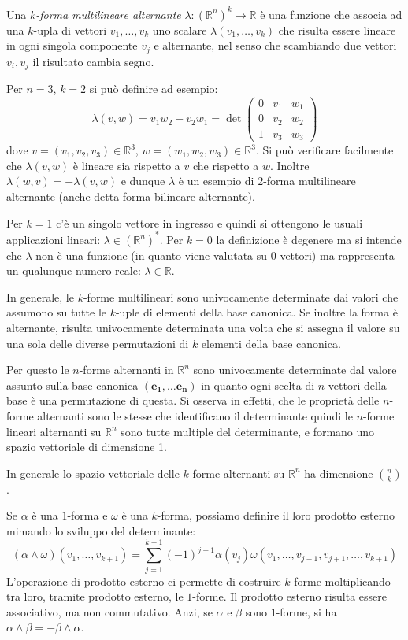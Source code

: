 \documentclass[italian,a4paper]{scrartcl}
\newcommand{\RR}{{\mathbb R}}
\renewcommand{\vec}{\mathbf}
\begin{document}
Una \emph{$k$-forma multilineare alternante} $\lambda\colon (\RR^n)^k \to \RR$ è
una funzione che associa ad una $k$-upla di vettori $v_1,\dots,v_k$
uno scalare $\lambda(v_1,\dots, v_k)$ che risulta essere lineare in
ogni singola componente $v_j$ e alternante, nel senso che scambiando
due vettori $v_i, v_j$ il risultato cambia segno.

\begin{example}
Per $n=3$, $k=2$ si può definire ad esempio:
\[
 \lambda(v, w) = v_1w_2 - v_2w_1
= \det\begin{pmatrix}
0 & v_1 & w_1\\
0 & v_2 & w_2\\
1 & v_3 & w_3
\end{pmatrix}
\]
dove $v=(v_1,v_2,v_3) \in \RR^3$, $w=(w_1,w_2,w_3) \in \RR^3$. Si può
verificare facilmente che $\lambda(v,w)$ è lineare sia rispetto a $v$
che rispetto a $w$. Inoltre $\lambda(w,v) = -\lambda(v,w)$ e dunque
$\lambda$ è un esempio di $2$-forma multilineare alternante (anche
detta forma bilineare alternante).
\end{example}

Per $k=1$ c'è un singolo vettore in ingresso e quindi si ottengono le
usuali applicazioni lineari: $\lambda \in (\RR^n)^*$. Per $k=0$ la definizione è
degenere ma si intende che $\lambda$ non è una funzione (in quanto
viene valutata su $0$ vettori) ma rappresenta un qualunque numero reale:
$\lambda\in \mathbb R$.

In generale,
le $k$-forme multilineari sono univocamente determinate dai valori che
assumono su tutte le $k$-uple di elementi della base canonica. Se
inoltre la forma è alternante, risulta univocamente determinata una
volta che si assegna il valore su una sola delle diverse permutazioni
di $k$ elementi della base canonica.

Per questo le $n$-forme alternanti in
$\RR^n$ sono univocamente determinate dal valore assunto sulla base
canonica $(\vec {e_1},\dots \vec{e_n})$ in quanto ogni scelta di $n$
vettori della base è una permutazione di questa.
Si osserva in effetti, che le proprietà
delle $n$-forme alternanti sono le stesse che identificano il determinante
quindi le
$n$-forme lineari alternanti su $\RR^n$ sono tutte multiple del
determinante, e formano uno spazio vettoriale di dimensione 1.

In generale lo spazio
vettoriale delle $k$-forme alternanti su $\RR^n$ ha dimensione ${n
  \choose k}$.

Se $\alpha$ è una $1$-forma e $\omega$ è una $k$-forma, possiamo
definire il loro prodotto esterno mimando lo sviluppo del
determinante:
\[
  (\alpha \wedge \omega)(v_1,\dots,v_{k+1}) 
  = \sum_{j=1}^{k+1}
(-1)^{j+1}\alpha(v_j) \omega(v_1,\dots, v_{j-1},v_{j+1},\dots,v_{k+1})
\]
L'operazione di prodotto esterno ci permette di costruire
$k$-forme moltiplicando tra loro, tramite prodotto esterno, le
$1$-forme. Il prodotto esterno risulta essere associativo, ma non
commutativo. Anzi, se $\alpha$ e $\beta$ sono $1$-forme, si ha
$\alpha\wedge \beta  = - \beta \wedge \alpha$.
\end{document}
